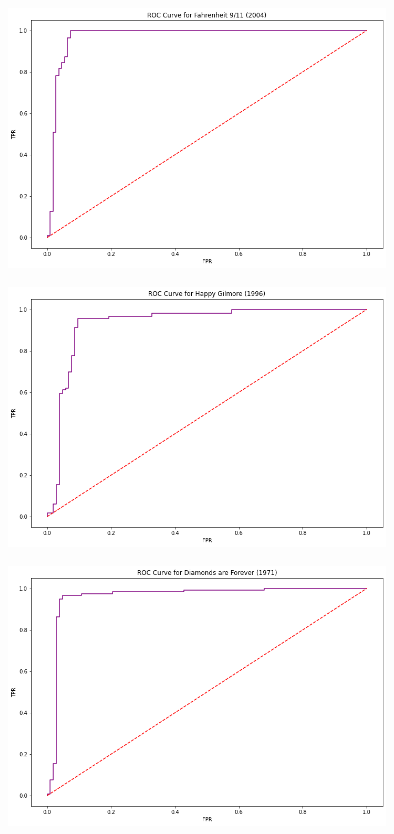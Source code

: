 \documentclass{article}
\begin{document}
\begin{figure}[t]
  \centering
  \includegraphics[width=10cm]{data anlysis project 2/logistic_1.png}
 \caption{}
 \label{fig:1}
\end{figure}

\begin{figure}[t]
  \centering
  \includegraphics[width=10cm]{data anlysis project 2/logistic_2.png}
 \caption{}
 \label{fig:1}
\end{figure}

\begin{figure}[t]
  \centering
  \includegraphics[width=10cm]{data anlysis project 2/logistic_3.png}
 \caption{}
 \label{fig:1}
\end{figure}
\end{document}
